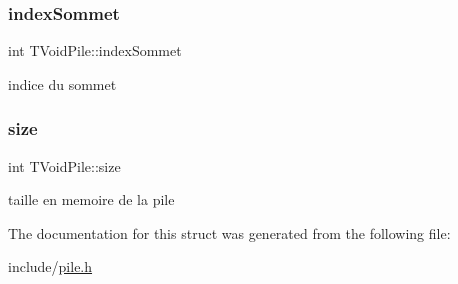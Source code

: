 \subsubsection{\texorpdfstring{index\+Sommet}{indexSommet}}
{\footnotesize\ttfamily int T\+Void\+Pile\+::index\+Sommet}

indice du sommet \mbox{\label{structTVoidPile_a1c5535f494a3c080f0ee15e615105895}} 
\subsubsection{\texorpdfstring{size}{size}}
{\footnotesize\ttfamily int T\+Void\+Pile\+::size}

taille en memoire de la pile 

The documentation for this struct was generated from the following file\+:\begin{DoxyCompactItemize}
\item 
include/\hyperlink{pile_8h}{pile.\+h}\end{DoxyCompactItemize}
